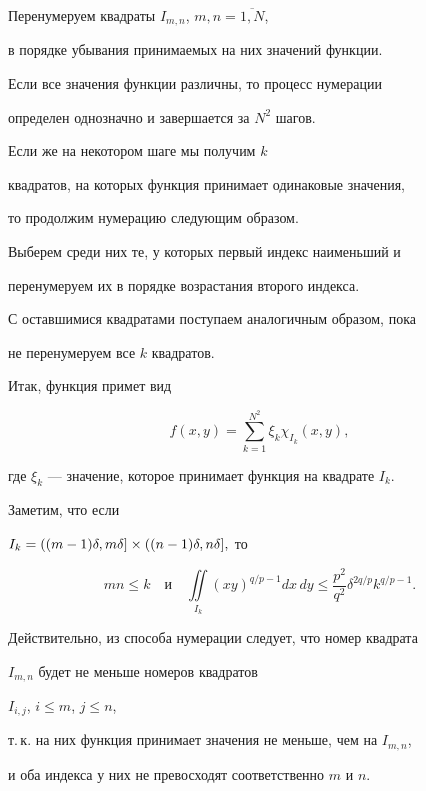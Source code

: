 Перенумеруем квадраты $I_{m,n}$, $m,n=\overline{1,N}$,


в порядке убывания принимаемых на них значений функции.


Если все значения функции различны, то процесс нумерации


определен однозначно и завершается за $N^2$ шагов.


Если же на некотором шаге мы получим $k$


квадратов, на которых функция принимает одинаковые значения,


то продолжим нумерацию следующим образом.


Выберем среди них те, у которых первый индекс наименьший и


перенумеруем их в порядке возрастания второго индекса.


С оставшимися квадратами поступаем аналогичным образом, пока


не перенумеруем все $k$ квадратов.





Итак, функция примет вид


$$


f(x,y) = \sum_{k=1}^{N^2} \xi_k \chi_{I_k}(x,y),


$$


где $\xi_k$ --- значение, которое принимает функция на квадрате $I_k$.


Заметим, что если


$I_k =\linebreak ((m-1)\delta,m\delta] \times ((n-1)\delta,n\delta],$ то


\begin{equation}


mn \le k \quad \text{и} \quad


\iint\limits_{I_k} (xy)^{q/p-1}dx\,dy


\le \frac{p^2}{q^2} \delta^{2q/p} k^{q/p-1}.


\end{equation}


Действительно, из способа нумерации следует, что номер квадрата


$I_{m,n}$ будет не меньше номеров квадратов


$I_{i,j}$, $i\le m$, $j\le n$,


т.\,к. на них функция принимает значения не меньше, чем на $I_{m,n}$,


и оба индекса у них не превосходят соответственно $m$ и $n$.





